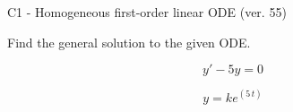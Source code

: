 \begin{exercise}
  \begin{exerciseTitle}C1 - Homogeneous first-order linear ODE (ver. 55)\end{exerciseTitle}
  \begin{exerciseStatement}
    
Find the general solution to the given ODE.

    
\[y'-5y=0\]

  \end{exerciseStatement}
  \begin{exerciseAnswer}
    
\[y= k e^{\left(5 \, t\right)}\]

  \end{exerciseAnswer}
\end{exercise}